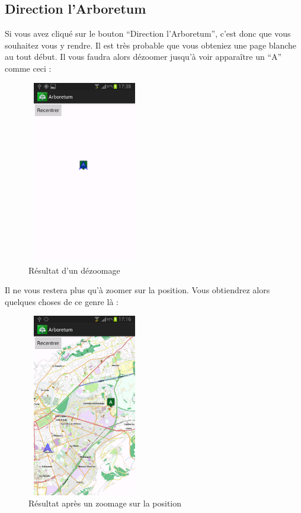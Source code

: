 \documentclass[a4paper,11pt]{article}
\begin{document}
    \subsection{Direction l'Arboretum}
    Si vous avez cliqué sur le bouton ``Direction l'Arboretum'', c'est donc que vous souhaitez vous y rendre. Il est très probable que vous obteniez
    une page blanche au tout début. Il vous faudra alors dézoomer jusqu'à voir apparaître un ``A'' comme ceci : 
     \begin{figure}[H]
     \begin{center}
      \includegraphics[width=5cm,height=8cm]{pointA.png}
    \caption{Résultat d'un dézoomage}
     \end{center}
    \end{figure}
    \newpage
    Il ne vous restera plus qu'à zoomer sur la position. Vous obtiendrez alors quelques choses de ce genre là :
    \begin{figure}[H]
     \begin{center}
      \includegraphics[width=5cm,height=8cm]{grenoble.png}
    \caption{Résultat après un zoomage sur la position}
     \end{center}
    \end{figure}
    
\end{document}
